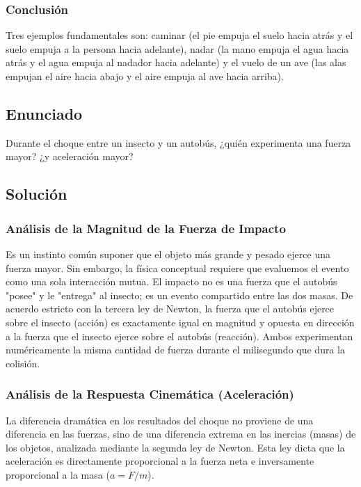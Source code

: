 \documentclass[12pt]{article}
\begin{document}
\subsubsection*{Conclusión}
Tres ejemplos fundamentales son: caminar (el pie empuja el suelo hacia atrás y el suelo empuja a la persona hacia adelante), nadar (la mano empuja el agua hacia atrás y el agua empuja al nadador hacia adelante) y el vuelo de un ave (las alas empujan el aire hacia abajo y el aire empuja al ave hacia arriba).

\newpage

\subsection*{Enunciado}
Durante el choque entre un insecto y un autobús, ¿quién experimenta una fuerza mayor? ¿y aceleración mayor?

\subsection*{Solución}

\subsubsection*{Análisis de la Magnitud de la Fuerza de Impacto}
Es un instinto común suponer que el objeto más grande y pesado ejerce una fuerza mayor. Sin embargo, la física conceptual requiere que evaluemos el evento como una sola interacción mutua. El impacto no es una fuerza que el autobús "posee" y le "entrega" al insecto; es un evento compartido entre las dos masas. De acuerdo estricto con la tercera ley de Newton, la fuerza que el autobús ejerce sobre el insecto (acción) es exactamente igual en magnitud y opuesta en dirección a la fuerza que el insecto ejerce sobre el autobús (reacción). Ambos experimentan numéricamente la misma cantidad de fuerza durante el milisegundo que dura la colisión.

\subsubsection*{Análisis de la Respuesta Cinemática (Aceleración)}
La diferencia dramática en los resultados del choque no proviene de una diferencia en las fuerzas, sino de una diferencia extrema en las inercias (masas) de los objetos, analizada mediante la segunda ley de Newton. Esta ley dicta que la aceleración es directamente proporcional a la fuerza neta e inversamente proporcional a la masa ($a = F / m$). 
\end{document}
